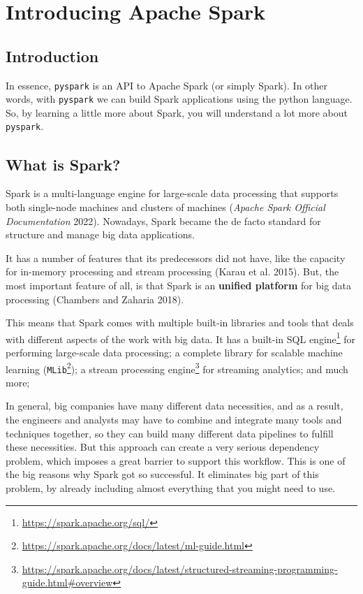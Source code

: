 \documentclass[
  11pt,
  letterpaper,
  DIV=11,
  numbers=noendperiod]{scrreprt}
\begin{document}

\hypertarget{sec-introd-spark}{%
\chapter{Introducing Apache Spark}\label{sec-introd-spark}}

\hypertarget{introduction-2}{%
\section{Introduction}\label{introduction-2}}

In essence, \texttt{pyspark} is an API to Apache Spark (or simply
Spark). In other words, with \texttt{pyspark} we can build Spark
applications using the python language. So, by learning a little more
about Spark, you will understand a lot more about \texttt{pyspark}.

\hypertarget{what-is-spark}{%
\section{What is Spark?}\label{what-is-spark}}

Spark is a multi-language engine for large-scale data processing that
supports both single-node machines and clusters of machines
(\emph{Apache Spark Official Documentation} 2022). Nowadays, Spark
became the de facto standard for structure and manage big data
applications.

It has a number of features that its predecessors did not have, like the
capacity for in-memory processing and stream processing (Karau et al.
2015). But, the most important feature of all, is that Spark is an
\textbf{unified platform} for big data processing (Chambers and Zaharia
2018).

This means that Spark comes with multiple built-in libraries and tools
that deals with different aspects of the work with big data. It has a
built-in SQL engine\footnote{\url{https://spark.apache.org/sql/}} for
performing large-scale data processing; a complete library for scalable
machine learning (\texttt{MLib}\footnote{\url{https://spark.apache.org/docs/latest/ml-guide.html}});
a stream processing engine\footnote{\url{https://spark.apache.org/docs/latest/structured-streaming-programming-guide.html\#overview}}
for streaming analytics; and much more;

In general, big companies have many different data necessities, and as a
result, the engineers and analysts may have to combine and integrate
many tools and techniques together, so they can build many different
data pipelines to fulfill these necessities. But this approach can
create a very serious dependency problem, which imposes a great barrier
to support this workflow. This is one of the big reasons why Spark got
so successful. It eliminates big part of this problem, by already
including almost everything that you might need to use.
\end{document}
